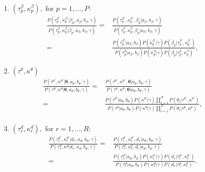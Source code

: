 \documentclass[a4paper]{article}
\begin{document}
\begin{itemize}
	\item [1.] $(\tau^\beta_p, \kappa^\beta_p), \mbox{ for } p=1,\ldots,P$:
	\begin{equation}
	\begin{aligned}
	\frac{P(\tau^{\beta\prime}_p, \kappa^{\beta\prime}_p|\beta_p, a_\beta, b_\beta,\gamma)}{P(\tau^\beta_p, \kappa^\beta_p|\beta_p, a_\beta, b_\beta,\gamma)}=&\frac{P(\tau^{\beta\prime}_p, \kappa^{\beta\prime}_p, \beta_p| a_\beta, b_\beta,\gamma)}{P(\tau^\beta_p, \kappa^\beta_p,\beta_p|a_\beta, b_\beta,\gamma)}\\=&\frac{P(\tau^{\beta\prime}_p|a_\beta, b_\beta)P(\kappa^{\beta\prime}_p|\gamma)P( \beta_p|\tau^{\beta\prime}_p, \kappa^{\beta\prime}_p) }{P(\tau^{\beta}_p|a_\beta, b_\beta)P(\kappa^{\beta}_p|\gamma)P( \beta_p|\tau^{\beta}_p, \kappa^{\beta}_p)},
	\end{aligned}
	\end{equation}
	\item [2.] $(\tau^\theta, \kappa^\theta)$
	\begin{equation}
	\begin{aligned}
	\frac{P(\tau^{\theta\prime}, \kappa^{\theta\prime}|\boldsymbol{\theta}, a_\theta, b_\theta,\gamma)}{P(\tau^\theta, \kappa^\theta|\boldsymbol{\theta}, a_\theta, b_\theta,\gamma)}=&\frac{P(\tau^{\theta\prime}, \kappa^{\theta\prime}, \boldsymbol{\theta}| a_\theta, b_\theta,\gamma)}{P(\tau^\theta, \kappa^\theta,\boldsymbol{\theta}|a_\theta, b_\theta,\gamma)}\\=&\frac{P(\tau^{\theta\prime}|a_\theta, b_\theta)P(\kappa^{\theta\prime}|\gamma)\prod_{i=1}^N P(\theta_i|\tau^{\theta\prime}, \kappa^{\theta\prime}) }{P(\tau^{\theta}|a_\theta, b_\theta)P(\kappa^{\theta}|\gamma)\prod_{i=1}^NP( \theta_i|\tau^{\theta}, \kappa^{\theta})},\\
	\end{aligned}
	\end{equation}
	\item [3.] $(\tau_r^d, \kappa_r^d),$ for $r=1,\ldots,R$:
	\begin{equation}
	\begin{aligned}
	\frac{P(\tau_r^{d\prime}, \kappa_r^{d\prime}|d_r, a_d, b_d,\gamma)}{P(\tau_r^d, \kappa^d|d_r, a_d, b_d,\gamma)}=&\frac{P(\tau_r^{d\prime}, \kappa_r^{d\prime}, d_r| a_d, b_d,\gamma)}{P( \tau_r^d, \kappa_r^d,d_r| a_d, b_d,\gamma)}\\=&\frac{P(\tau_r^{d\prime}| a_d, b_d)P(\kappa_r^{d\prime}|\gamma)P(d_r|\tau_r^{d\prime}, \kappa_r^{d\prime}) }{P(\tau_r^d| a_d, b_d)P(\kappa_r^{d}|\gamma)P( d_r| \tau_r^{d},\kappa_r^{d})}.
	\end{aligned}
	\end{equation}
\end{itemize}
\end{document}
